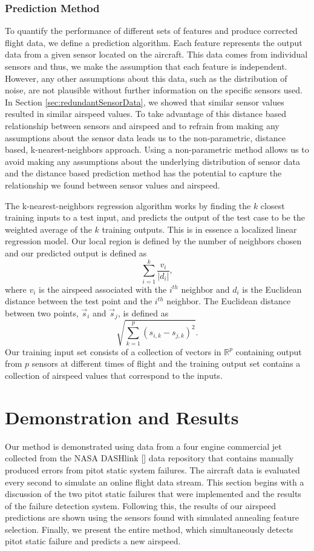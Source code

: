 \documentclass[]{aiaa-tc}
\begin{document}
\subsubsection{Prediction Method}
To quantify the performance of different sets of features and produce corrected flight data, we define a prediction algorithm. Each feature represents the output data from a given sensor located on the aircraft. This data comes from individual sensors and thus, we make the assumption that each feature is independent. However, any other assumptions about this data, such as the distribution of noise, are not plausible without further information on the specific sensors used. In Section \ref{sec:redundantSensorData}, we showed that similar sensor values resulted in similar airspeed values. To take advantage of this distance based relationship between sensors and airspeed and to refrain from making any assumptions about the sensor data leads us to the non-parametric, distance based, k-nearest-neighbors approach. Using a non-parametric method allows us to avoid making any assumptions about the underlying distribution of sensor data and the distance based prediction method has the potential to capture the relationship we found between sensor values and airspeed. 

The k-nearest-neighbors regression algorithm works by finding the $k$ closest training inputs to a test input, and predicts the output of the test case to be the weighted average of the $k$ training outputs. This is in essence a localized linear regression model. Our local region is defined by the number of neighbors chosen and our predicted output is defined as $$\sum_{i = 1}^k \frac{v_i}{|d_i|},$$ where $v_i$ is the airspeed associated with the $i^{th}$ neighbor and $d_i$ is the Euclidean distance between the test point and the $i^{th}$ neighbor. The Euclidean distance between two points, $\vec{s}_i$ and $\vec{s}_j$, is defined as $$\sqrt{\displaystyle \sum_{k=1}^p (s_{i,k}-s_{j,k})^2}.$$
Our training input set consists of a collection of vectors in $\mathbb{R}^p$ containing output from $p$ sensors at different times of flight and the training output set contains a collection of airspeed values that correspond to the inputs. 


\section{Demonstration and Results}
\label{sec:demo}
\label{sec:results}


Our method is demonstrated using data from a four engine commercial jet collected from the NASA DASHlink [] data repository that contains manually produced errors from pitot static system failures. The aircraft data is evaluated every second to simulate an online flight data stream. This section begins with a discussion of the two pitot static failures that were implemented and the results of the failure detection system. Following this, the results of our airspeed predictions are shown using the sensors found with simulated annealing feature selection. Finally, we present the entire method, which simultaneously detects pitot static failure and predicts a new airspeed.
\end{document}
